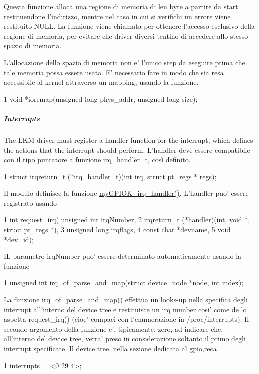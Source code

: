 Questa funzione alloca una regione di memoria di len byte a partire da start restituendone l'indirizzo, mentre nel caso in cui si verifichi un errore viene restituito N\+U\+L\+L. La funzione viene chiamata per ottenere l'accesso esclusivo della regione di memoria, per evitare che driver diversi tentino di accedere allo stesso spazio di memoria.

L'allocazione dello spazio di memoria non e' l'unico step da eseguire prima che tale memoria possa essere usata. E' necessario fare in modo che sia resa accessibile al kernel attraverso un mapping, usando la funzione.


\begin{DoxyCode}
1 void *ioremap(unsigned long phys\_addr, unsigned long size);
\end{DoxyCode}



\begin{DoxyItemize}
\item \subparagraph*{Interrupts}
\end{DoxyItemize}

The L\+K\+M driver must register a handler function for the interrupt, which defines the actions that the interrupt should perform. L'handler deve essere compatibile con il tipo puntatore a funzione irq\+\_\+handler\+\_\+t, così definito. 
\begin{DoxyCode}
1 struct irqreturn\_t (*irq\_handler\_t)(int irq, struct pt\_regs * regs);
\end{DoxyCode}
 Il modulo definisce la funzione \hyperlink{group___kernel-_module_ga2fc230a12a97aa63e43b2dc4aec73511}{my\+G\+P\+I\+O\+K\+\_\+irq\+\_\+handler()}. L'handler puo' essere registrato usando


\begin{DoxyCode}
1 int request\_irq(    unsigned int irqNumber,
2                     irqreturn\_t (*handler)(int, void *, struct pt\_regs *),
3                     unsigned long irqflags,
4                     const char *devname,
5                     void *dev\_id);
\end{DoxyCode}


I\+L parametro irq\+Number puo' essere determinato automaticamente usando la funzione


\begin{DoxyCode}
1 unsigned int irq\_of\_parse\_and\_map(struct device\_node *node, int index);
\end{DoxyCode}


La funzione irq\+\_\+of\+\_\+parse\+\_\+and\+\_\+map() effettua un looks-\/up nella specifica degli interrupt all'interno del device tree e restituisce un irq number cosi' come de lo aspetta request\+\_\+irq() (cioe' compaci con l'enumerazione in /proc/interrupts). Il secondo argomento della funzione e', tipicamente, zero, ad indicare che, all'interno del device tree, verra' preso in considerazione soltanto il primo degli interrupt specificate. Il device tree, nella sezione dedicata al gpio,reca 
\begin{DoxyCode}
1 interrupts = <0 29 4>;
\end{DoxyCode}


